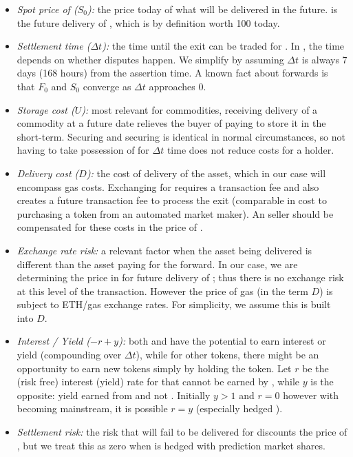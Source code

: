 \begin{itemize}
\item \textit{Spot price of \ethone ($S_0$):} the price today of what will be delivered in the future. \ethxx is the future delivery of \ethone, which is by definition worth 100 \ethone today. 
\item \textit{Settlement time ($\Delta t$):} the time until the exit can be traded for \ethone. In \arb, the time depends on whether disputes happen. We simplify by assuming $\Delta t$ is always 7 days (168 hours) from the assertion time. A known fact about forwards is that $F_0$ and $S_0$ converge as $\Delta t$ approaches 0. 
\item \textit{Storage cost ($U$):} most relevant for commodities, receiving delivery of a commodity at a future date relieves the buyer of paying to store it in the short-term. Securing \ethxx and securing \ethone is identical in normal circumstances, so not having to take possession of \ethone for $\Delta t$ time does not reduce costs for a \ethxx holder. 
\item \textit{Delivery cost ($D$):} the cost of delivery of the asset, which in our case will encompass gas costs. Exchanging \ethone for \ethxx requires a transaction fee and also creates a future transaction fee to process the exit (comparable in cost to purchasing a token from an automated market maker). An \ethone seller should be compensated for these costs in the price of \ethxx.
\item \textit{Exchange rate risk:} a relevant factor when the asset being delivered is different than the asset paying for the forward. In our case, we are determining the price in \ethone for future delivery of \ethone; thus there is no exchange risk at this level of the transaction. However the price of gas (in the term $D$) is subject to ETH/gas exchange rates. For simplicity, we assume this is built into $D$.
\item \textit{Interest / Yield ($-r+y$):} both \ethone and \ethxx have the potential to earn interest or yield (compounding over $\Delta t$), while for other tokens, there might be an opportunity to earn new tokens simply by holding the token. Let $r$ be the (risk free) interest (yield) rate for \ethone that cannot be earned by \ethxx, while $y$ is the opposite: yield earned from \ethxx and not \ethone. Initially $y>1$ and $r=0$ however with \ethxx becoming mainstream, it is possible $r=y$ (especially hedged \ethxx). 
\item \textit{Settlement risk:} the risk that \ethone will fail to be delivered for \ethxx discounts the price of \ethxx, but we treat this as zero when \ethxx is hedged with prediction market shares. 

\end{itemize}

